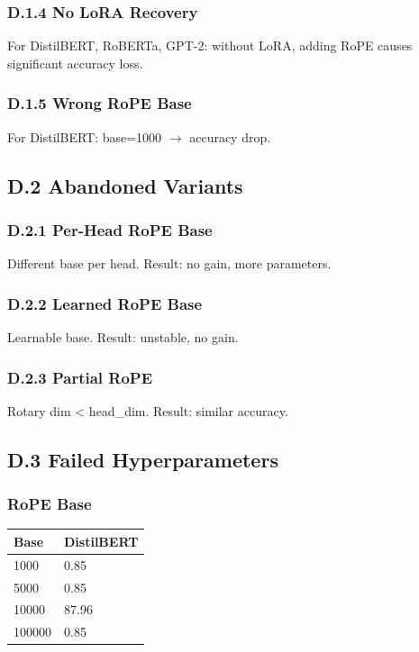 {\subsubsection{D.1.4 No LoRA Recovery}

For DistilBERT, RoBERTa, GPT-2: without LoRA, adding RoPE causes 
significant accuracy loss.

\subsubsection{D.1.5 Wrong RoPE Base}

For DistilBERT: base=1000 $\to$ accuracy drop.

\subsection{D.2 Abandoned Variants}

\subsubsection{D.2.1 Per-Head RoPE Base}

Different base per head. Result: no gain, more parameters.

\subsubsection{D.2.2 Learned RoPE Base}

Learnable base. Result: unstable, no gain.

\subsubsection{D.2.3 Partial RoPE}

Rotary dim < head\_dim. Result: similar accuracy.

\subsection{D.3 Failed Hyperparameters}

\subsubsection{RoPE Base}

\begin{table}[H]
\centering
\small
\begin{tabular}{ll}
\toprule
\textbf{Base} & \textbf{DistilBERT} \\
\midrule
1000 & 0.85 \\
5000 & 0.85 \\
10000 & 87.96 \\
100000 & 0.85 \\
\bottomrule
\end{tabular}
\end{table}

}
